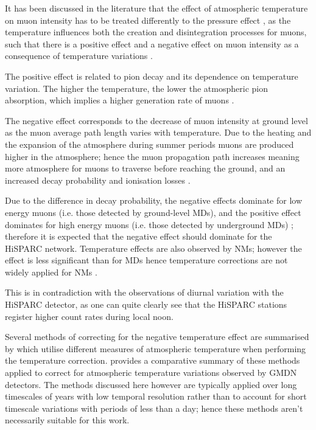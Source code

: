 It has been discussed in the literature that the effect of atmospheric temperature on muon intensity has to be treated differently to the pressure effect \citep{berkova_temperature_2011}, as the temperature influences both the creation and disintegration processes for muons, such that there is a positive effect and a negative effect on muon intensity as a consequence of temperature variations \citep{mendoncca_temperature_2016}. 

The positive effect is related to pion decay and its dependence on temperature variation. The higher the temperature, the lower the atmospheric pion absorption, which implies a higher generation rate of muons \citep{mendoncca_temperature_2016}.

The negative effect corresponds to the decrease of muon intensity at ground level as the muon average path length varies with temperature. Due to the heating and the expansion of the atmosphere during summer periods muons are produced higher in the atmosphere; hence the muon propagation path increases meaning more atmosphere for muons to traverse before reaching the ground, and an increased decay probability and ionisation losses \citep{savic_pressure_2015, mendoncca_temperature_2016}.

Due to the difference in decay probability, the negative effects dominate for low energy muons (i.e. those detected by ground-level MDs), and the positive effect dominates for high energy muons (i.e. those detected by underground MDs) \citep{berkova_temperature_2011}; therefore it is expected that the negative effect should dominate for the HiSPARC network. Temperature effects are also observed by NMs; however the effect is less significant than for MDs hence temperature corrections are not widely applied for NMs \citep{mendoncca_temperature_2016}.

This is in contradiction with the observations of diurnal variation with the HiSPARC detector, as one can quite clearly see that the HiSPARC stations register higher count rates during local noon.

Several methods of correcting for the negative temperature effect are summarised by \cite{berkova_temperature_2011} which utilise different measures of atmospheric temperature when performing the temperature correction. \cite{mendoncca_temperature_2016} provides a comparative summary of these methods applied to correct for atmospheric temperature variations observed by GMDN detectors. The methods discussed here however are typically applied over long timescales of years with low temporal resolution rather than to account for short timescale variations with periods of less than a day; hence these methods aren't necessarily suitable for this work.

